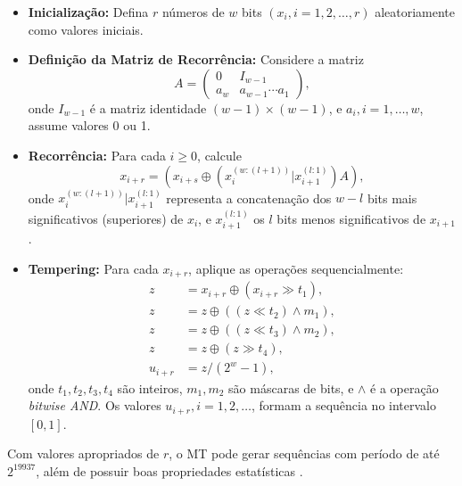 \begin{itemize}
    \item \textbf{Inicialização:} Defina $r$ números de $w$ bits $(x_i, i = 1, 2, \ldots, r)$ aleatoriamente como valores iniciais.
    \item \textbf{Definição da Matriz de Recorrência:} Considere a matriz
    \[
    A = \begin{pmatrix}
    0 & I_{w-1} \\
    a_w & a_{w-1} \cdots a_1
    \end{pmatrix},
    \]
    onde $I_{w-1}$ é a matriz identidade $(w-1) \times (w-1)$, e $a_i, i = 1, \ldots, w$, assume valores 0 ou 1.
    \item \textbf{Recorrência:} Para cada $i \geq 0$, calcule
    \[
    x_{i+r} = (x_{i+s} \oplus (x_i^{(w:(l+1))} | x_{i+1}^{(l:1)}) A),
    \]
    onde $x_i^{(w:(l+1))}| x_{i+1}^{(l:1)}$ representa a concatenação dos $w-l$ bits mais significativos (superiores)
    de $x_i$, e $x_{i+1}^{(l:1)}$ os $l$ bits menos significativos de $x_{i+1}$.
    \item \textbf{Tempering:} Para cada $x_{i+r}$, aplique as operações sequencialmente:
    \[
    \begin{aligned}
    z &= x_{i+r} \oplus (x_{i+r} \gg t_1), \\
    z &= z \oplus ((z \ll t_2) \land m_1), \\
    z &= z \oplus ((z \ll t_3) \land m_2), \\
    z &= z \oplus (z \gg t_4), \\
    u_{i+r} &= z / (2^w - 1),
    \end{aligned}
    \]
    onde $t_1, t_2, t_3, t_4$ são inteiros, $m_1, m_2$ são máscaras de bits, 
    e $\land$ é a operação \textit{bitwise AND}. Os valores $u_{i+r}, i = 1, 2, \ldots$, 
    formam a sequência no intervalo $[0, 1]$.
\end{itemize}

Com valores apropriados de $r$, o MT pode gerar sequências com período de até
$2^{19937}$, além de possuir boas propriedades
estatísticas \parencite{matsumoto1998mersenne}.

